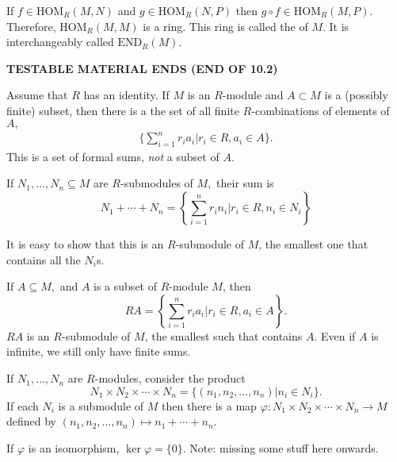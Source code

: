 \documentclass{article}
\numberwithin{equation}{section}
\begin{document}
If $f\in \text{HOM}_R(M,N)$ and $g \in \text{HOM}_R(N,P)$ then $g\circ f \in \text{HOM}_R(M,P).$ Therefore, $\text{HOM}_R(M,M)$ is a ring. This ring is called the  of $M.$ It is interchangeably called $\text{END}_R(M).$
\vspace{2mm}

\textbf{TESTABLE MATERIAL ENDS (END OF 10.2)}
\vspace{2mm}

Assume that $R$ has an identity. If $M$ is an $R$-module and $A\subset M$ is a (possibly finite) subset, then there is a  the set of all finite $R$-combinations of elements of $A,$
\begin{align*}
    \{\sum_{i=1}^n r_ia_i | r_i \in R, a_i \in A\}.
\end{align*}
This is a set of formal sums, \textit{not} a subset of $A.$
\begin{definition}
    If $N_1,\dots,N_n \subseteq M$ are $R$-submodules of $M,$ their sum is 
    \begin{equation}
        N_1+\cdots + N_n = \left\{\sum_{i=1}^n r_in_i| r_i \in R, n_i \in N_i\right\}
    \end{equation} 
\end{definition}
It is easy to show that this is an $R$-submodule of $M$, the smallest one that contains all the $N_i$s.
\begin{definition}
    If $A\subseteq M,$ and $A$ is a subset of $R$-module $M$, then 
    \begin{equation}
        RA = \left\{\sum_{i=1}^n r_ia_i | r_i \in R, a_i \in A\right\}.
    \end{equation}
    $RA$ is an $R$-submodule of $M$, the smallest such that contains $A.$ Even if $A$ is infinite, we still only have finite sums.
\end{definition}
If $N_1,\dots,N_n$ are $R$-modules, consider the product \begin{equation}
    N_1\times N_2 \times \cdots \times N_n = \{(n_1,n_2,\dots,n_n)| n_i \in N_i\}.
\end{equation}
If each $N_i$ is a submodule of $M$ then there is a map $\varphi: N_1 \times N_2 \times \cdots \times N_n \to M$ defined by $(n_1,n_2,\dots,n_n) \mapsto n_1+\cdots +n_n.$ 

If $\varphi$ is an isomorphism, $\ker\varphi = \{0\}.$ Note: missing some stuff here onwards.
\end{document}
